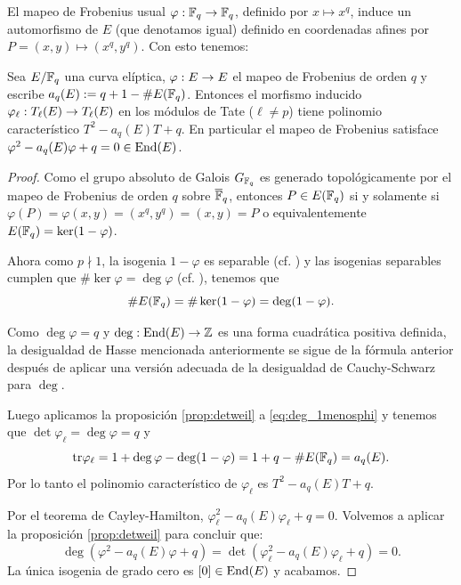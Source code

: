 \documentclass[../../tesis_maestria]{subfiles}
\begin{document}
El mapeo de Frobenius usual $\varphi:\mathbb{F}_q\rightarrow\mathbb{F}_q$, definido por $x\mapsto x^q$, induce un
automorfismo de $E$ (que denotamos igual) definido en coordenadas afines por
$P=(x,y)\mapsto (x^q,y^q)$. Con esto tenemos:

\begin{thm}\label{thm:traza_frobenius}
  Sea $E/\mathbb{F}_q$ una curva el\'iptica, $\varphi:E\rightarrow E$ el mapeo de Frobenius de orden $q$ y
  escribe $a_q(E):=q+1-\# E(\mathbb{F}_q)$. Entonces el morfismo inducido
  $\varphi_{\ell}:T_{\ell}(E)\rightarrow T_{\ell}(E)$ en los m\'odulos de Tate ($\ell\neq p$) tiene polinomio
  caracter\'istico $T^2-a_q(E)T+q$. En particular el mapeo de Frobenius satisface
  $\varphi^2-a_q(E)\varphi+q=0\in\mathrm{End}(E)$.
\end{thm}
\begin{proof}
  Como el grupo absoluto de Galois $G_{\mathbb{F}_q}$ es generado topol\'ogicamente por el mapeo de
  Frobenius de orden $q$ sobre $\overline{\mathbb{F}}_q$, entonces $P\in E(\mathbb{F}_q)$ si y solamente si
  $\varphi(P)=\varphi(x,y)=(x^q,y^q)=(x,y)=P$ o equivalentemente $E(\mathbb{F}_q)=\ker(1-\varphi)$.

  Ahora como $p\nmid1$, la isogenia $1-\varphi$ es separable (cf.
  \cite[cap\'itulo III, corolario 5.5]{SilvermanTAOEC}) y las isogenias separables cumplen
  que $\#\ker\varphi=\deg\varphi$ (cf. \cite[cap\'itulo III, teorema 4.10.c]{SilvermanTAOEC}),
  tenemos que
  \begin{equation}\label{eq:deg_1menosphi}
    \# E(\mathbb{F}_q)=\#\ker(1-\varphi)=\deg(1-\varphi).
  \end{equation}
  \begin{nota}
    Como $\deg\varphi=q$ y $\deg:\mathrm{End}(E)\rightarrow\mathbb{Z}$ es una forma cuadr\'atica positiva definida, la
    desigualdad de Hasse mencionada anteriormente se sigue de la f\'ormula anterior despu\'es de
    aplicar una versi\'on adecuada de la desigualdad de Cauchy-Schwarz para $\deg$.
  \end{nota}

  Luego aplicamos la proposici\'on \ref{prop:detweil} a \ref{eq:deg_1menosphi} y tenemos que
  $\det\varphi_{\ell}=\deg\varphi=q$ y
  \[
    \mathrm{tr}\varphi_{\ell}=1+\deg\varphi-\deg(1-\varphi)=1+q-\# E(\mathbb{F}_q)=a_q(E).
  \]
  Por lo tanto el polinomio caracter\'istico de $\varphi_{\ell}$ es $T^2-a_q(E)T+q$.

  Por el teorema de Cayley-Hamilton, $\varphi_{\ell}^2-a_q(E)\varphi_{\ell}+q=0$. Volvemos a aplicar
  la proposici\'on \ref{prop:detweil} para concluir que:
  \[
    \deg(\varphi^2-a_q(E)\varphi+q)=\det(\varphi_{\ell}^2-a_q(E)\varphi_{\ell}+q)=0.
  \]
  La \'unica isogenia de grado cero es $[0]\in\mathrm{End}(E)$ y acabamos.
\end{proof}
\end{document}
